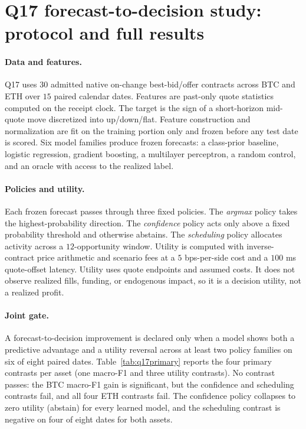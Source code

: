 \section{Q17 forecast-to-decision study: protocol and full results}
\label{app:q17}

\paragraph{Data and features.} Q17 uses $30$ admitted native on-change best-bid/offer
contracts across BTC and ETH over $15$ paired calendar dates. Features are past-only quote
statistics computed on the receipt clock. The target is the sign of a short-horizon
mid-quote move discretized into up/down/flat. Feature construction and normalization are
fit on the training portion only and frozen before any test date is scored. Six model
families produce frozen forecasts: a class-prior baseline, logistic regression, gradient
boosting, a multilayer perceptron, a random control, and an oracle with access to the
realized label.

\paragraph{Policies and utility.} Each frozen forecast passes through three fixed policies.
The \emph{argmax} policy takes the highest-probability direction. The \emph{confidence}
policy acts only above a fixed probability threshold and otherwise abstains. The
\emph{scheduling} policy allocates activity across a $12$-opportunity window. Utility is
computed with inverse-contract price arithmetic and scenario fees at a $5$ bps-per-side
cost and a $100$ ms quote-offset latency. Utility uses quote endpoints and assumed costs. It does not observe realized fills, funding, or endogenous impact, so it is a decision
utility, not a realized profit.

\paragraph{Joint gate.} A forecast-to-decision improvement is declared only when a model
shows both a predictive advantage and a utility reversal across at least two policy families
on six of eight paired dates. Table~\ref{tab:q17primary} reports the four primary contrasts
per asset (one macro-F1 and three utility contrasts). No contrast passes: the BTC macro-F1
gain is significant, but the confidence and scheduling contrasts fail, and all four ETH
contrasts fail. The confidence policy collapses to zero utility (abstain) for every learned
model, and the scheduling contrast is negative on four of eight dates for both assets.

